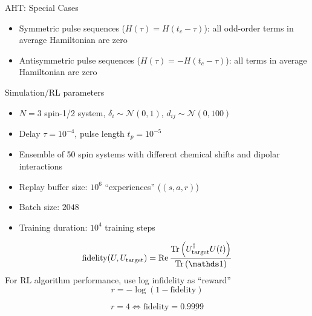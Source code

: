 \documentclass{beamer}
\begin{document}
\begin{frame}{AHT: Special Cases}

\begin{itemize}

\item
  Symmetric pulse sequences (\(H(\tau) = H(t_c - \tau)\)): all odd-order
  terms in average Hamiltonian are zero
\item
  Antisymmetric pulse sequences (\(H(\tau) = - H(t_c - \tau)\)): all
  terms in average Hamiltonian are zero
\end{itemize}
\end{frame}

%
%

\begin{frame}{Simulation/RL parameters}

\begin{itemize}
    \item $N=3$ spin-1/2 system, $\delta_i \sim \mathcal{N}(0, 1)$, $d_{ij} \sim \mathcal{N}(0, 100)$
    \item Delay $\tau = 10^{-4}$, pulse length $t_p = 10^{-5}$
    \item Ensemble of 50 spin systems with different chemical shifts and dipolar interactions
\end{itemize}


\begin{itemize}
    \item Replay buffer size: $10^6$ ``experiences'' ($(s, a, r)$)
    \item Batch size: $2048$
    \item Training duration: $10^4$ training steps
\end{itemize}

\[
    \text{fidelity}(U, U_\text{target}) = \Re{
        \frac{\Tr{U_\text{target}^\dagger U(t)}}{\Tr{\identity}}
    }
\]
For RL algorithm performance, use log infidelity as ``reward''
\[
    r = -\log \left( 1 - \text{fidelity} \right)
\]

\[
r = 4 \iff \text{fidelity} = 0.\underline{9999}
\]


\end{frame}
\end{document}
